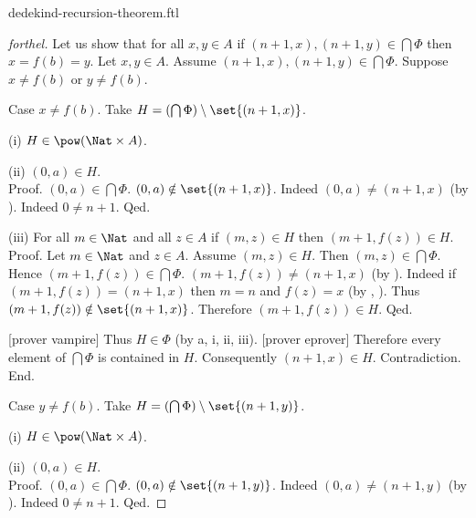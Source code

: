 \documentclass{naproche-library}
\begin{document}
\begin{smodule}{dedekind-recursion-theorem.ftl}
\begin{proof}[forthel]
        Let us show that for all $x, y \in A$ if $(n + 1, x),
        (n + 1, y) \in \bigcap \Phi$ then $x = f(b) = y$.
          Let $x, y \in A$.
          Assume $(n + 1, x), (n + 1, y) \in \bigcap \Phi$.
          Suppose $x \neq f(b)$ or $y \neq f(b)$.

          Case $x \neq f(b)$.
            Take $H = (\bigcap \Phi) \setminus \set{(n + 1,x)}$.

            (i) $H \in \pow(\Nat \times A)$.

            (ii) $(0,a) \in H$. \\
            Proof.
              $(0,a) \in \bigcap \Phi$.
              $(0,a) \notin \set{(n + 1,x)}$.
              Indeed $(0,a) \neq (n + 1,x)$ (by ).
              Indeed $0 \neq n + 1$.
            Qed.

            (iii) For all $m \in \Nat$ and all $z \in A$ if $(m,z) \in H$ then $(m + 1,f(z)) \in H$. \\
            Proof.
              Let $m \in \Nat$ and $z \in A$.
              Assume $(m,z) \in H$.
              Then $(m,z) \in \bigcap \Phi$.
              Hence $(m + 1,f(z)) \in \bigcap \Phi$.
              $(m + 1,f(z)) \neq (n + 1,x)$ (by ).
              Indeed if $(m + 1,f(z)) = (n + 1,x)$ then $m = n$ and $f(z) = x$ (by , ).
              Thus $(m + 1,f(z)) \notin \set{(n + 1,x)}$.
              Therefore $(m + 1,f(z)) \in H$.
            Qed.

            [prover vampire]
            Thus $H \in \Phi$ (by a, i, ii, iii).
            [prover eprover]
            Therefore every element of $\bigcap \Phi$ is contained in $H$.
            Consequently $(n + 1,x) \in H$.
            Contradiction.
          End.

          Case $y \neq f(b)$.
            Take $H = (\bigcap \Phi) \setminus \set{(n + 1,y)}$.

            (i) $H \in \pow(\Nat \times A)$.

            (ii) $(0,a) \in H$. \\
            Proof.
              $(0,a) \in \bigcap \Phi$.
              $(0,a) \notin \set{(n + 1,y)}$.
              Indeed $(0,a) \neq (n + 1,y)$ (by ).
              Indeed $0 \neq n + 1$.
            Qed.


\end{proof}
\end{smodule}
\end{document}
